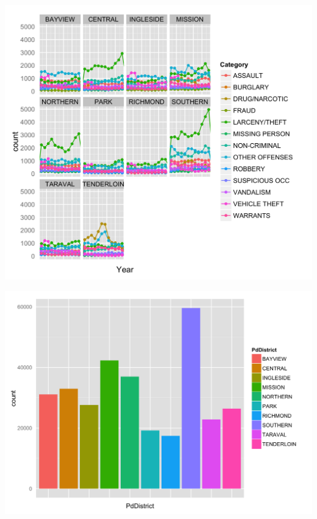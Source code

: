 \documentclass[11pt]{article}
\begin{document}
\begin{center}

\includegraphics{district-by-cat.png}

\includegraphics{district-hist.png}


\end{center}
\end{document}
